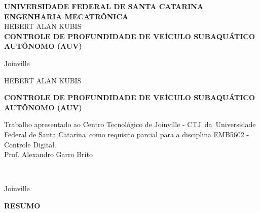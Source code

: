 \documentclass[12pt, a4paper]{article}
\newcommand{\universidade}{Universidade Federal de Santa Catarina}
\newcommand{\centro}{Centro Tecnológico de Joinville - CTJ}
\newcommand{\disciplina}{EMB5602 - Controle Digital}
\newcommand{\curso}{Engenharia Mecatrônica}
\newcommand{\professor}{Prof. Alexandro Garro Brito}
\newcommand{\titulo}{Controle de profundidade de veículo subaquático autônomo (AUV)}
\newcommand{\autor}{Hebert Alan Kubis}
\begin{document}
	\begin{titlepage}
		\begin{center}
			{\bfseries \MakeUppercase{\universidade}}\\
			{\bfseries \MakeUppercase{\curso}}\\[3cm]
			
			{\MakeUppercase{\autor}}\\

			\vfill
			{\bfseries \MakeUppercase{\titulo}}\\
			\vfill

			{Joinville}\\
			{\number\year}

		\end{center}
	\end{titlepage}
	
	\begin{titlepage}
		\begin{center}
			{\MakeUppercase{\autor}}\\
			\vfill

			{\bfseries \MakeUppercase{\titulo}}\\[2cm]
			
			\hspace*{8cm}
			\parbox[t]{\dimexpr\textwidth-8cm\relax}{
				{Trabalho apresentado ao \centro\ da\ \universidade\ como requisito 
				parcial para a disciplina \disciplina.}\\[1cm]
				{\professor}\\
			}\\

			\vfill

			{Joinville}\\
			{\number\year}

		\end{center}
	\end{titlepage}

	\clearpage
	\begin{center}
		\normalsize\bfseries\MakeUppercase{Resumo}
	\end{center}
\end{document}
